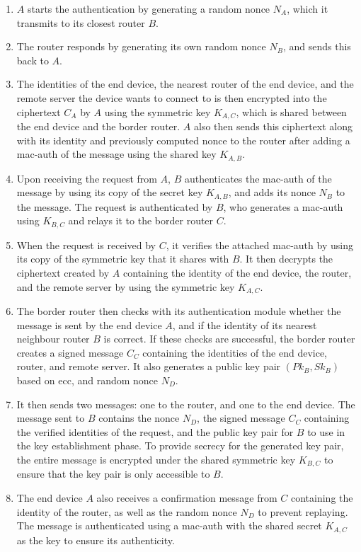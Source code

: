 \begin{enumerate}

\item $A$ starts the authentication by generating a random nonce $N_A$, which it transmits to its closest router $B$.

\item The router responds by generating its own random nonce $N_B$, and sends this back to $A$.

\item The identities of the end device, the nearest router of the end device, and the remote server the device wants to connect to is then encrypted into the ciphertext $C_A$ by $A$ using the symmetric key $K_{A,C}$, which is shared between the end device and the border router. $A$ also then sends this ciphertext along with its identity and previously computed nonce to the router after adding a \gls{mac-auth} of the message using the shared key $K_{A,B}$.

\item Upon receiving the request from $A$, $B$ authenticates the \gls{mac-auth} of the message by using its copy of the secret key $K_{A,B}$, and adds its nonce $N_B$ to the message. The request is authenticated by $B$, who generates a \gls{mac-auth} using $K_{B,C}$ and relays it to the border router $C$.

\item When the request is received by $C$, it verifies the attached \gls{mac-auth} by using its copy of the symmetric key that it shares with $B$. It then decrypts the ciphertext created by $A$ containing the identity of the end device, the router, and the remote server by using the symmetric key $K_{A,C}$.

\item The border router then checks with its authentication module whether the message is sent by the end device $A$, and if the identity of its nearest neighbour router $B$ is correct. If these checks are successful, the border router creates a signed message $C_C$ containing the identities of the end device, router, and remote server. It also generates a public key pair $(Pk_B, Sk_B)$ based on \gls{ecc}, and random nonce $N_D$.

\item It then sends two messages: one to the router, and one to the end device. The message sent to $B$ contains the nonce $N_D$, the signed message $C_C$ containing the verified identities of the request, and the public key pair for $B$ to use in the key establishment phase. To provide secrecy for the generated key pair, the entire message is encrypted under the shared symmetric key $K_{B,C}$ to ensure that the key pair is only accessible to $B$.

\item The end device $A$ also receives a confirmation message from $C$ containing the identity of the router, as well as the random nonce $N_D$ to prevent replaying. The message is authenticated using a \gls{mac-auth} with the shared secret $K_{A,C}$ as the key to ensure its authenticity.

\end{enumerate}



